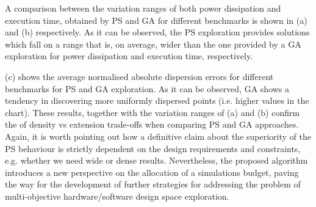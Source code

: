 A comparison between the variation ranges of both power dissipation
and execution time, obtained by PS and GA for different benchmarks is
shown in (a) and (b) respectively.  As it can
be observed, the PS exploration provides solutions which fall on a
range that is, on average, wider than the one provided by a GA
exploration for power dissipation and execution time, respectively.

\begin{figure}
  \begin{center}
  \end{center}
\end{figure}

(c) shows the average normalised absolute
dispersion errors for different benchmarks for PS and GA
exploration. As it can be observed, GA shows a tendency in
discovering more uniformly dispersed points (i.e. higher values in the
chart). These results,
together with the variation ranges of (a) and
(b) confirm the of density vs extension trade-offs
when comparing PS and GA approaches. Again, it
is worth pointing out how a definitive claim about the superiority of
the PS behaviour is strictly dependent on the design 
requirements and constraints, e.g. whether we need wide or dense
results. Nevertheless, the proposed algorithm introduces a new
perspective on the allocation of a simulations budget, paving the way for
the development of further strategies for addressing the problem of
multi-objective hardware/software design space exploration.

